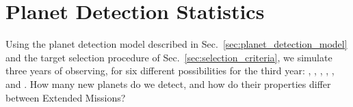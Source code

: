 \section{Planet Detection Statistics}  
\label{sec:newly_detected_planet_metrics}

Using the planet detection model described in Sec.~\ref{sec:planet_detection_model} and the target selection procedure of Sec.~\ref{sec:selection_criteria}, we simulate three years of \tess observing, for six different possibilities for the third year:
\nhemi, \npole, \shemiAvoid, \elong, \eshort, and \hemis.
How many new planets do we detect, and how do their properties differ between Extended Missions?








